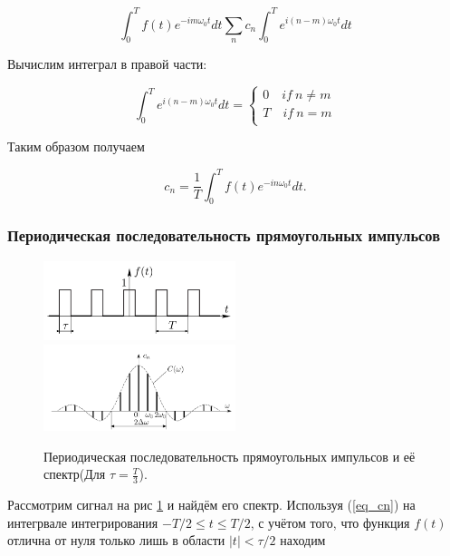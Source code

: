 \documentclass{article}
\begin{document}
\begin{equation*}
    \int_0^T f(t)e^{-im\omega_0t}dt  \sum_n c_n \int_0^T e^{i(n - m)\omega_0t}dt
\end{equation*}

Вычислим интеграл в правой части:

\begin{equation*}
    \int_0^T e^{i(n-m)\omega_0t}dt = 
    \begin{cases}
        0 \quad if \: n \neq m\\
        T \quad if \: n = m\\
    \end{cases}
\end{equation*}

Таким образом получаем

\begin{equation}
    c_n = \frac{1}{T}\int_0^T f(t)e^{-in\omega_0t}dt.
    \label{eq_cn}
\end{equation}

\subsubsection{Периодическая последовательность прямоугольных импульсов}


\begin{figure}[H]
\centering
\includegraphics[width=0.5\textwidth]{sq_imp_example.png}
\includegraphics[width=0.5\textwidth]{sq_imp_spect_example.png}
\caption{Периодическая последовательность прямоугольных импульсов и её спектр(Для $\tau = \frac{T}{3}$).} 
\label{sq_imp_example}
\end{figure}
Рассмотрим сигнал на рис \ref{sq_imp_example} и найдём его спектр.
Используя (\ref{eq_cn}) на интегрвале интегрирования \( -T/2 \le t \le T/2 \), с учётом того, что функция 
\(f(t)\) отлична от нуля только лишь в области \( |t| < \tau/2 \) находим
\end{document}
